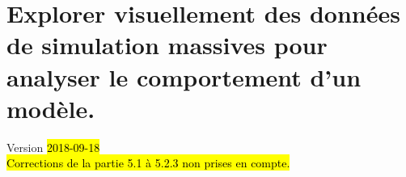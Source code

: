 \chapter{Explorer visuellement des données de simulation massives pour analyser le comportement d'un modèle.}
\begin{center}
	{\large Version \hl{2018-09-18}}\\
	\hl{Corrections de la partie 5.1 à 5.2.3 non prises en compte.}

\end{center}
\minitoc

\clearpage

%
%
%
%
%
%
